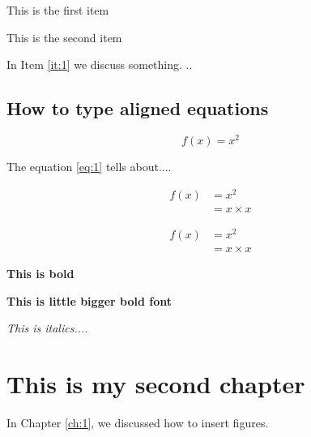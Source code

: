 \documentclass[12pt,a4paper,oneside]{book}
\begin{document}
\begin{enumerate}[label = {[O\arabic*]}]
	\item\label{it:1}This is the first item 
	
	\item This is the second item 
\end{enumerate}

In Item \ref{it:1} we discuss something. ..


\section{How to type aligned equations}


\begin{equation}\label{eq:1}
 f(x) = x^2
\end{equation}


The equation \ref{eq:1} tells about....




\begin{align}
	f(x) & = x^2\nonumber \\
	    & = x\times x
\end{align}



\begin{align*}
f(x) & = x^2\\
& = x\times x
\end{align*}

\textbf{This is bold}

\textbf{\large This is little bigger bold font}

\textit{This is italics.... }



\chapter{This is my second chapter}


In Chapter \ref{ch:1}, we discussed how to insert figures. 
\end{document}
